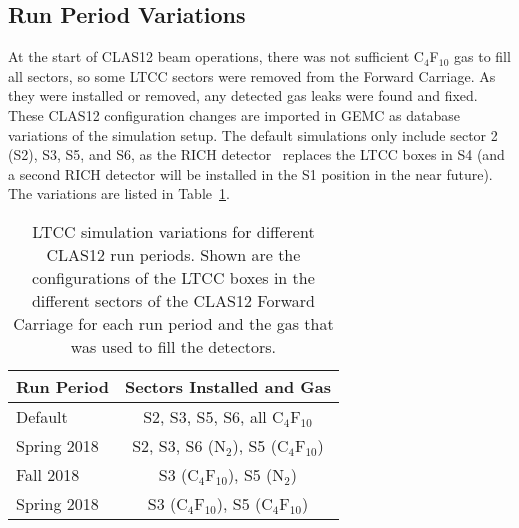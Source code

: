 \subsection{Run Period Variations}

At the start of CLAS12 beam operations, there was not sufficient C$_4$F$_{10}$ gas to fill all sectors, so some LTCC
sectors were removed from the Forward Carriage. As they were installed or removed, any detected gas leaks were found and
fixed. These CLAS12 configuration changes are imported in GEMC as database variations of the simulation setup. The
default simulations only include sector 2 (S2), S3, S5, and S6, as the RICH detector~\cite{rich-nim} replaces the LTCC
boxes in S4 (and a second RICH detector will be installed in the S1 position in the near future). The variations are listed
in Table~\ref{tab:simVariations}.

\begin{table}
	\begin{center}
		\begin{tabular}{| l | c |}
			\hline \hline
			Run Period       & Sectors Installed and Gas \\
			\hline
			Default          & S2, S3, S5, S6, all C$_4$F$_{10}$    \\
			Spring 2018  & S2, S3, S6 (N$_2$), S5 (C$_4$F$_{10}$)  \\
			Fall 2018    & S3 (C$_4$F$_{10}$), S5 (N$_2$)          \\
			Spring 2018  & S3 (C$_4$F$_{10}$), S5 (C$_4$F$_{10}$) \\
			\hline \hline
		\end{tabular}
	\end{center}
	\caption{LTCC simulation variations for different CLAS12 run periods. Shown are the configurations of the
          LTCC boxes in the different sectors of the CLAS12 Forward Carriage for each run period and the gas that
          was used to fill the detectors.}
	\label{tab:simVariations}
\end{table}

